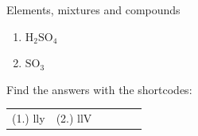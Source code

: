\begin{exercises}{Elements, mixtures and compounds}
{\begin{enumerate}[noitemsep, label=\textbf{\arabic*}. ]
\begin{enumerate}[noitemsep, label=\textbf{\alph*}. ]
\label{m38708*uid33}\item $\mathrm{H}{}_{2}\mathrm{SO}{}_{4}$\label{m38708*uid34}\item $\mathrm{SO}{}_{3}$\end{enumerate}
                \end{enumerate}
    \label{m38708*cid4}
\par {} Find the answers with the shortcodes:
 \par \begin{tabular}[h]{cccccc}
 (1.) lly  &  (2.) llV  & \end{tabular}}
\end{exercises}
